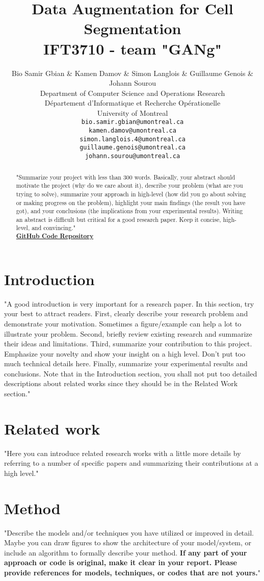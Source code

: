 \documentclass{article} %
\title{Data Augmentation for Cell Segmentation \\
IFT3710 - team "GANg"}
\author{Bio Samir Gbian \& Kamen Damov \& Simon Langlois \& Guillaume Genois \& Johann Sourou\\
Department of Computer Science and Operations Research \\
Département d'Informatique et Recherche Opérationelle \\
University of Montreal \\
\texttt{bio.samir.gbian@umontreal.ca} \\
\texttt{kamen.damov@umontreal.ca} \\
\texttt{simon.langlois.4@umontreal.ca} \\
\texttt{guillaume.genois@umontreal.ca} \\
\texttt{johann.sourou@umontreal.ca}
}
\begin{document}
\maketitle
\begin{abstract}
"Summarize your project with less than 300 words. Basically, your abstract should motivate the project (why do we care about it), describe your problem (what are you trying to solve), summarize your approach in high-level (how did you go about solving or making progress on the problem), highlight your main findings (the result you have got), and your conclusions (the implications from your experimental results). Writing an abstract is difficult but critical for a good research paper. Keep it concise, high-level, and convincing." \\
{\hspace*{\fill}\href{https://github.com/KamenDamov/IFT3710-Advanced-Project-in-ML-AI}{\textbf{GitHub Code Repository}}}
\end{abstract}

\section{Introduction}
"A good introduction is very important for a research paper. In this section, try your best to attract readers. First, clearly describe your research problem and demonstrate your motivation. Sometimes
a figure/example can help a lot to illustrate your problem. Second, briefly review existing research and summarize their ideas and limitations. Third, summarize your contribution to this project. Emphasize your novelty and show your insight on a high level. Don’t put too much technical details here. Finally, summarize your experimental results and conclusions. Note that in the Introduction section, you shall not put too
detailed descriptions about related works since they should be in the Related Work section."

\section{Related work}
"Here you can introduce related research works with a little more details by referring to a number of specific papers and summarizing their contributions at a high level."

\section{Method}
"Describe the models and/or techniques you have utilized or improved in detail. Maybe you can draw figures to show the architecture of your model/system, or include an algorithm to formally describe
your method. \textbf{If any part of your approach or code is original, make it clear in your report. Please provide references for models, techniques, or codes that are not yours.}"
\end{document}
